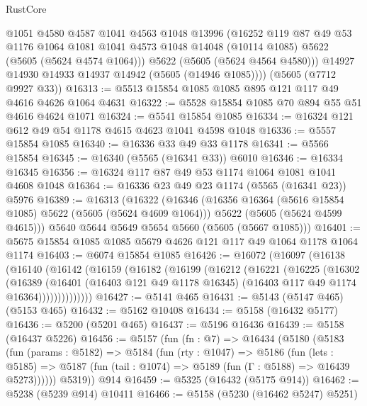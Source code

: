 \begin{lexlean}{RustCore}
\begin{coremodule}
          @1051
          @4580
          @4587
          @1041
          @4563
          @1048
          @13996
          (@16252
            @119
            @87
            @49
            @53
            @1176
            @1064
            @1081
            @1041
            @4573
            @1048
            @14048
            (@10114 @1085)
            @5622
            (@5605 (@5624 @4574 @1064)))
          @5622
          (@5605 (@5624 @4564 @4580)))
        @14927
        @14930
        @14933
        @14937
        @14942
        (@5605 (@14946 @1085))))
    (@5605 (@7712 @9927 @33))
@16313 := @5513 @15854 @1085 @1085 @895 @121 @117 @49 @4616 @4626 @1064 @4631
@16322 := @5528 @15854 @1085 @70 @894 @55 @51 @4616 @4624 @1071
@16324 := @5541 @15854 @1085
@16334 := @16324 @121 @612 @49 @54 @1178 @4615 @4623 @1041 @4598 @1048
@16336 := @5557 @15854 @1085
@16340 := @16336 @33 @49 @33 @1178
@16341 := @5566 @15854
@16345 := @16340 (@5565 (@16341 @33)) @6010
@16346 := @16334 @16345
@16356 := @16324 @117 @87 @49 @53 @1174 @1064 @1081 @1041 @4608 @1048
@16364 := @16336 @23 @49 @23 @1174 (@5565 (@16341 @23)) @5976
@16389 := @16313
    (@16322
      (@16346
        (@16356 @16364 (@5616 @15854 @1085) @5622 (@5605 (@5624 @4609 @1064)))
        @5622
        (@5605 (@5624 @4599 @4615)))
      @5640
      @5644
      @5649
      @5654
      @5660
      (@5605 (@5667 @1085)))
@16401 := @5675 @15854 @1085 @1085 @5679 @4626 @121 @117 @49 @1064 @1178 @1064 @1174
@16403 := @6074 @15854 @1085
@16426 := @16072
    (@16097
      (@16138
        (@16140
          (@16142
            (@16159
              (@16182
                (@16199
                  (@16212
                    (@16221
                      (@16225
                        (@16302
                          (@16389
                            (@16401
                              (@16403 @121 @49 @1178 @16345)
                              (@16403 @117 @49 @1174 @16364))))))))))))))
@16427 := @5141 @465
@16431 := @5143 (@5147 @465) (@5153 @465)
@16432 := @5162 @10408
@16434 := @5158 (@16432 @5177)
@16436 := @5200 (@5201 @465)
@16437 := @5196 @16436
@16439 := @5158 (@16437 @5226)
@16456 := @5157
    (fun (fn : @7) =>
    @16434
      (@5180
        (@5183
          (fun (params : @5182) =>
          @5184
            (fun (rty : @1047) =>
            @5186
              (fun (lets : @5185) =>
              @5187 (fun (tail : @1074) => @5189 (fun (Γ : @5188) => @16439 @5273))))))
        @5319))
    @914
@16459 := @5325 (@16432 (@5175 @914))
@16462 := @5238 (@5239 @914) @10411
@16466 := @5158 (@5230 (@16462 @5247) @5251)

\end{coremodule}
\end{lexlean}
